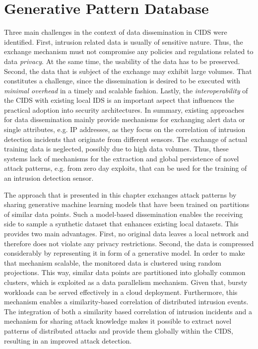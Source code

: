 \documentclass[../../main.tex]{subfiles}
\begin{document}
\chapter{Generative Pattern Database}\label{ch:generative_pattern_database}
Three main challenges in the context of data dissemination in CIDS were identified. First, intrusion related data is usually of sensitive nature. Thus, the exchange mechanism must not compromise any policies and regulations related to data \textit{privacy}. At the same time, the usability of the data has to be preserved. Second, the data that is subject of the exchange may exhibit large volumes. That constitutes a challenge, since the dissemination is desired to be executed with \textit{minimal overhead} in a timely and scalable fashion. Lastly, the \textit{interoperability} of the CIDS with existing local IDS is an important aspect that influences the practical adoption into security architectures. In summary, existing approaches for data dissemination mainly provide mechanisms for exchanging alert data or single attributes, e.g. IP addresses, as they focus on the correlation of intrusion detection incidents that originate from different sensors. The exchange of actual training data is neglected, possibly due to high data volumes. Thus, these systems lack of mechanisms for the extraction and global persistence of novel attack patterns, e.g. from zero day exploits, that can be used for the training of an intrusion detection sensor.

The approach that is presented in this chapter exchanges attack patterns by sharing generative machine learning models that have been trained on partitions of similar data points. Such a model-based dissemination enables the receiving side to sample a synthetic dataset that enhances existing local datasets. This provides two main advantages. First, no original data leaves a local network and therefore does not violate any privacy restrictions. Second, the data is compressed considerably by representing it in form of a generative model. In order to make that mechanism scalable, the monitored data is clustered using random projections. This way, similar data points are partitioned into globally common clusters, which is exploited as a data parallelism mechanism. Given that, bursty workloads can be served effectively in a cloud deployment. Furthermore, this mechanism enables a similarity-based correlation of distributed intrusion events. The integration of both a similarity based correlation of intrusion incidents and a mechanism for sharing attack knowledge makes it possible to extract novel patterns of distributed attacks and provide them globally within the CIDS, resulting in an improved attack detection.
\end{document}

